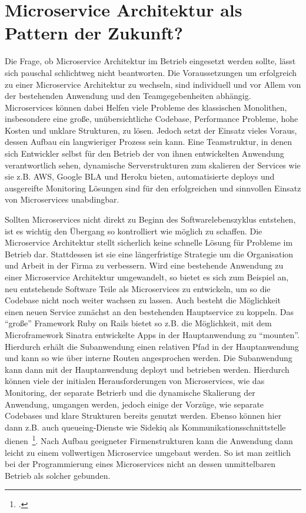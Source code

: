 \chapter{Microservice Architektur als Pattern der Zukunft?}

Die Frage, ob Microservice Architektur im Betrieb eingesetzt werden sollte, lässt sich pauschal schlichtweg nicht beantworten. Die Voraussetzungen um erfolgreich zu einer Microservice Architektur zu wechseln, sind individuell und vor Allem von der bestehenden Anwendung und den Teamgegebenheiten abhängig. Microservices können dabei Helfen viele Probleme des klassischen Monolithen, insbesondere eine große, unübersichtliche Codebase, Performance Probleme, hohe Kosten und unklare Strukturen, zu lösen. Jedoch setzt der Einsatz vieles Voraus, dessen Aufbau ein langwieriger Prozess sein kann. Eine Teamstruktur, in denen sich Entwickler selbst für den Betrieb der von ihnen entwickelten Anwendung verantwortlich sehen, dynamische Serverstrukturen  zum skalieren der Services wie sie z.B. AWS, Google BLA und Heroku bieten, automatisierte deploys und ausgereifte Monitoring Lösungen sind für den erfolgreichen und sinnvollen Einsatz von Microservices unabdingbar.

Sollten Microservices nicht direkt zu Beginn des Softwarelebenszyklus entstehen, ist es wichtig den Übergang so kontrolliert wie möglich zu schaffen. Die Microservice Architektur stellt sicherlich keine schnelle Lösung für Probleme im Betrieb dar. Stattdessen ist sie eine längerfristige Strategie um die Organisation und Arbeit in der Firma zu verbessern. Wird eine bestehende Anwendung zu einer Microservice Architektur umgewandelt, so bietet es sich zum Beispiel an, neu entstehende Software Teile als Microservices zu entwickeln, um so die Codebase nicht noch weiter wachsen zu lassen. Auch besteht die Möglichkeit einen neuen Service zunächst an den bestehenden Hauptservice zu koppeln. Das ``große'' Framework Ruby on Rails bietet so z.B. die Möglichkeit, mit dem Microframework Sinatra entwickelte Apps in der Hauptanwendung zu ``mounten''. Hierdurch erhält die Subanwendung einen relativen Pfad in der Hauptanwendung und kann so wie über interne Routen angesprochen werden. Die Subanwendung kann dann mit der Hauptanwendung deployt und betrieben werden. Hierdurch können viele der initialen Herausforderungen von Microservices, wie das Monitoring, der separate Betrierb und die dynamische Skalierung der Anwendung, umgangen werden, jedoch einige der Vorzüge, wie separate Codebases und klare Strukturen bereits genutzt werden. Ebenso können hier dann z.B. auch queueing-Dienste wie Sidekiq als Kommunikationsschnittstelle dienen~\footcite[vgl.][]{sidekiqmessaging}. Nach Aufbau geeigneter Firmenstrukturen kann die Anwendung dann leicht zu einem vollwertigen Microservice umgebaut werden. So ist man zeitlich bei der Programmierung eines Microservices nicht an dessen unmittelbaren Betrieb als solcher gebunden.

